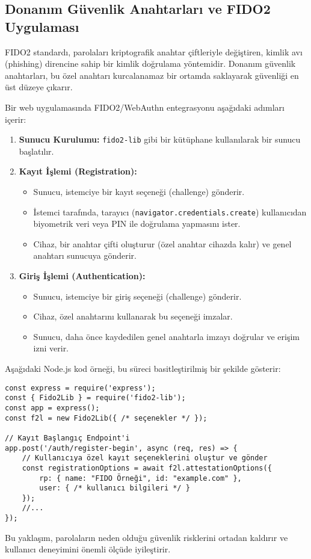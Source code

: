 \subsection{Donanım Güvenlik Anahtarları ve FIDO2 Uygulaması}

FIDO2 standardı, parolaları kriptografik anahtar çiftleriyle değiştiren, kimlik avı (phishing) direncine sahip bir kimlik doğrulama yöntemidir. Donanım güvenlik anahtarları, bu özel anahtarı kurcalanamaz bir ortamda saklayarak güvenliği en üst düzeye çıkarır.

Bir web uygulamasında FIDO2/WebAuthn entegrasyonu aşağıdaki adımları içerir:

\begin{enumerate}
    \item \textbf{Sunucu Kurulumu:} \verb|fido2-lib| gibi bir kütüphane kullanılarak bir sunucu başlatılır.
    \item \textbf{Kayıt İşlemi (Registration):}
    \begin{itemize}
        \item Sunucu, istemciye bir kayıt seçeneği (challenge) gönderir.
        \item İstemci tarafında, tarayıcı (\verb|navigator.credentials.create|) kullanıcıdan biyometrik veri veya PIN ile doğrulama yapmasını ister.
        \item Cihaz, bir anahtar çifti oluşturur (özel anahtar cihazda kalır) ve genel anahtarı sunucuya gönderir.
    \end{itemize}
    \item \textbf{Giriş İşlemi (Authentication):}
    \begin{itemize}
        \item Sunucu, istemciye bir giriş seçeneği (challenge) gönderir.
        \item Cihaz, özel anahtarını kullanarak bu seçeneği imzalar.
        \item Sunucu, daha önce kaydedilen genel anahtarla imzayı doğrular ve erişim izni verir.
    \end{itemize}
\end{enumerate}
Aşağıdaki Node.js kod örneği, bu süreci basitleştirilmiş bir şekilde gösterir:
\begin{verbatim}
const express = require('express');
const { Fido2Lib } = require('fido2-lib');
const app = express();
const f2l = new Fido2Lib({ /* seçenekler */ });

// Kayıt Başlangıç Endpoint'i
app.post('/auth/register-begin', async (req, res) => {
    // Kullanıcıya özel kayıt seçeneklerini oluştur ve gönder
    const registrationOptions = await f2l.attestationOptions({
        rp: { name: "FIDO Örneği", id: "example.com" },
        user: { /* kullanıcı bilgileri */ }
    });
    //...
});
\end{verbatim}
Bu yaklaşım, parolaların neden olduğu güvenlik risklerini ortadan kaldırır ve kullanıcı deneyimini önemli ölçüde iyileştirir.

